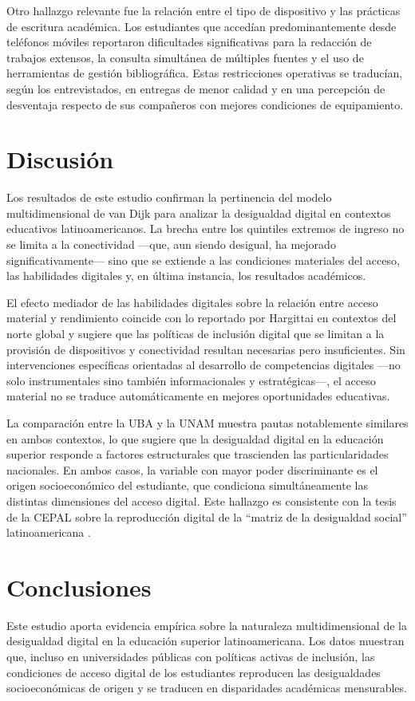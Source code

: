 \documentclass{article}
\begin{document}
Otro hallazgo relevante fue la relación entre el tipo de dispositivo y las prácticas de escritura académica. Los estudiantes que accedían predominantemente desde teléfonos móviles reportaron dificultades significativas para la redacción de trabajos extensos, la consulta simultánea de múltiples fuentes y el uso de herramientas de gestión bibliográfica. Estas restricciones operativas se traducían, según los entrevistados, en entregas de menor calidad y en una percepción de desventaja respecto de sus compañeros con mejores condiciones de equipamiento.


\section{Discusión}
Los resultados de este estudio confirman la pertinencia del modelo multidimensional de van Dijk \autocite{2565-VANDIJK2020} para analizar la desigualdad digital en contextos educativos latinoamericanos. La brecha entre los quintiles extremos de ingreso no se limita a la conectividad —que, aun siendo desigual, ha mejorado significativamente— sino que se extiende a las condiciones materiales del acceso, las habilidades digitales y, en última instancia, los resultados académicos.

El efecto mediador de las habilidades digitales sobre la relación entre acceso material y rendimiento coincide con lo reportado por Hargittai \autocite*{2563-HARGITTAI2002} en contextos del norte global y sugiere que las políticas de inclusión digital que se limitan a la provisión de dispositivos y conectividad resultan necesarias pero insuficientes. Sin intervenciones específicas orientadas al desarrollo de competencias digitales —no solo instrumentales sino también informacionales y estratégicas—, el acceso material no se traduce automáticamente en mejores oportunidades educativas.

La comparación entre la UBA y la UNAM muestra pautas notablemente similares en ambos contextos, lo que sugiere que la desigualdad digital en la educación superior responde a factores estructurales que trascienden las particularidades nacionales. En ambos casos, la variable con mayor poder discriminante es el origen socioeconómico del estudiante, que condiciona simultáneamente las distintas dimensiones del acceso digital. Este hallazgo es consistente con la tesis de la CEPAL sobre la reproducción digital de la “matriz de la desigualdad social” latinoamericana \autocite{2566-CEPAL2021}.


\section{Conclusiones}
Este estudio aporta evidencia empírica sobre la naturaleza multidimensional de la desigualdad digital en la educación superior latinoamericana. Los datos muestran que, incluso en universidades públicas con políticas activas de inclusión, las condiciones de acceso digital de los estudiantes reproducen las desigualdades socioeconómicas de origen y se traducen en disparidades académicas mensurables.
\end{document}
